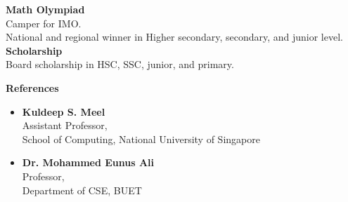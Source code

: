 \documentclass[a4paper,11pt,final]{article}
\newcommand{\CVSection}[1]
{\Large\textbf{#1}\par
	\SmallSep\normalsize\normalfont}
\newcommand{\CVItem}[1]
{\textbf{\color{Black} #1}}
\newcommand{\Sep}{\vspace{1.5em}}
\newcommand{\SmallSep}{\vspace{0.5em}}
\begin{document}
\CVItem{Math Olympiad}\\
Camper for IMO.
\\
National and regional winner in Higher secondary, secondary, and junior level.\\

\CVItem{Scholarship}\\
Board scholarship in HSC, SSC, junior, and primary.





\Sep
\CVSection{References}
\begin{itemize}
	\item \textbf{Kuldeep S. Meel}\\
	Assistant Professor,\\
	School of Computing, National University of Singapore
	\item \textbf{Dr. Mohammed Eunus Ali }\\
	Professor,\\
	Department of CSE, BUET
\end{itemize}	



	
\end{document}
